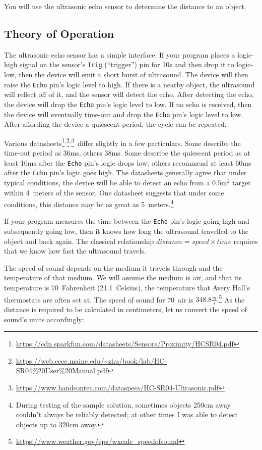 You will use the ultrasonic echo sensor to determine the distance to an object.

\subsection{Theory of Operation}

The ultrasonic echo sensor has a simple interface.
If your program places a logic-high signal on the sensor's \texttt{Trig} (``trigger'') pin for 10\textmu s and then drop it to logic-low, then the device will emit a short burst of ultrasound.
The device will then raise the \texttt{Echo} pin's logic level to high.
If there is a nearby object, the ultrasound will reflect off of it, and the sensor will detect the echo.
After detecting the echo, the device will drop the \texttt{Echo} pin's logic level to low.
If no echo is received, then the device will eventually time-out and drop the \texttt{Echo} pin's logic level to low.
After affording the device a quiescent period, the cycle can be repeated.

Various datasheets\footnote{
    \url{https://cdn.sparkfun.com/datasheets/Sensors/Proximity/HCSR04.pdf}}$^,$\footnote{\url{https://web.eece.maine.edu/~zhu/book/lab/HC-SR04\%20User\%20Manual.pdf}}$^,$\footnote{\url{https://www.handsontec.com/dataspecs/HC-SR04-Ultrasonic.pdf}
}\ differ slightly in a few particulars.
Some describe the time-out period as 36ms, others 38ms.
Some describe the quiescent period as at least 10ms after the \texttt{Echo} pin's logic drops low; others recommend at least 60ms after the \texttt{Echo} pin's logic goes high.
The datasheets generally agree that under typical conditions, the device will be able to detect an echo from a $0.5\mathrm{m}^2$ target within 4~meters of the sensor.
One datasheet suggests that under some conditions, this distance may be as great as 5~meters.\footnote{
    During testing of the sample solution, sometimes objects 250cm away couldn't always be reliably detected; at other times I was able to detect objects up to 320cm away.
}

If your program measures the time between the \texttt{Echo} pin's logic going high and subsequently going low, then it knows how long the ultrasound travelled to the object and back again.
The classical relationship $distance = speed \times time$ requires that we know how fast the ultrasound travels.

The speed of sound depends on the medium it travels through and the temperature of that medium.
We will assume the medium is air, and that its temperature is 70\degree~Fahrenheit (21.1\degree~Celsius), the temperature that Avery Hall's thermostats are often set at.
The speed of sound for 70\degree\ air is $348.8\frac{m}{s}$.\footnote{
    \url{https://www.weather.gov/epz/wxcalc_speedofsound}
} As the distance is required to be calculated in centimeters, let us convert the speed of sound's units accordingly:

